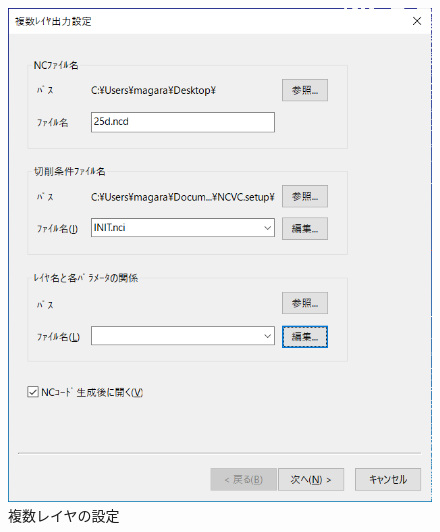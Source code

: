 \begin{minipage}{0.5\textwidth}
\begin{figure}[H]
\centering
\includegraphics[scale=0.6]{No3/fig/25d-make1.png}
\caption{複数レイヤの設定}
\label{fig:25d-make1.png}
\end{figure}
\end{minipage}
